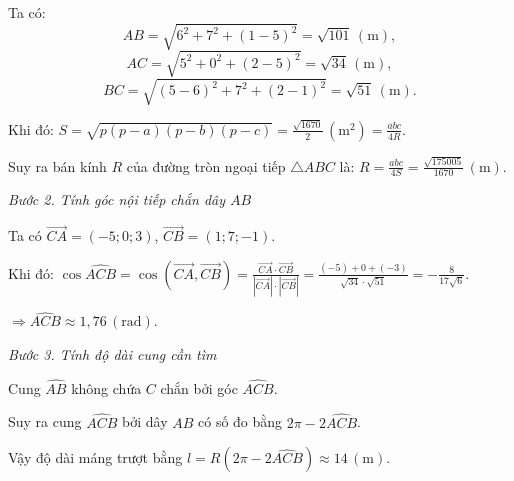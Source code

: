 \documentclass[12pt,a4paper,oneside]{book}
\theoremstyle{theorem}
\theoremstyle{definition}
\begin{document}
        Ta có:
        $$AB=\sqrt{6^2+7^2+(1-5)^2}=\sqrt{101}\,(\mathrm{m}),$$
        $$AC=\sqrt{5^2+0^2+(2-5)^2}=\sqrt{34}\,(\mathrm{m}),$$
        $$BC=\sqrt{(5-6)^2+7^2+(2-1)^2}=\sqrt{51}\,(\mathrm{m}).$$
        
        Khi đó: $S=\sqrt{p(p-a)(p-b)(p-c)}
        =\displaystyle \frac{\sqrt{1670}}{2}\,(\mathrm{m}^2)
        =\frac{abc}{4R}.$
        
        Suy ra bán kính $R$ của đường tròn ngoại tiếp $\triangle ABC$ là:
        $R=\displaystyle \frac{abc}{4S}
        =\frac{\sqrt{175005}}{1670}\,(\mathrm{m}).$
        
        \noindent \textit{Bước 2. Tính góc nội tiếp chắn dây $AB$}
        
        Ta có $\overrightarrow{CA}=(-5;0;3)$, $\overrightarrow{CB}=(1;7;-1)$.
        
        Khi đó:
        $\cos\widehat{ACB}
        =\cos(\overrightarrow{CA},\overrightarrow{CB})
        =\displaystyle \frac{\overrightarrow{CA}\cdot\overrightarrow{CB}}
        {|\overrightarrow{CA}|\cdot|\overrightarrow{CB}|}
        =\frac{(-5)+0+(-3)}
        {\sqrt{34}\cdot\sqrt{51}}
        =-\frac{8}{17\sqrt{6}}.$
        
        $\Rightarrow \widehat{ACB}\approx1,76\,(\mathrm{rad}).$
        
        \noindent \textit{Bước 3. Tính độ dài cung cần tìm}
        
        Cung $\widehat{AB}$ không chứa $C$ chắn bởi góc $\widehat{ACB}$.
        
        Suy ra cung $\widehat{ACB}$ bởi dây $AB$ có số đo bằng $2\pi-2\widehat{ACB}$.
        
        Vậy độ dài máng trượt bằng
        $l=R(2\pi-2\widehat{ACB})\approx14\,(\mathrm{m}).$
    
   
\end{document}
